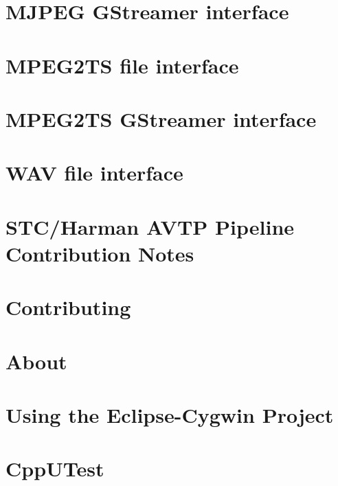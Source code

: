 \documentclass[twoside]{book}
\newcommand{\+}{\discretionary{\mbox{\scriptsize$\hookleftarrow$}}{}{}}
\begin{document}
\chapter{M\+J\+P\+EG G\+Streamer interface}
\label{mjpeg_gst_intf}
\hypertarget{mjpeg_gst_intf}{}

\chapter{M\+P\+E\+G2\+TS file interface}
\label{mpeg2ts_file_intf}
\hypertarget{mpeg2ts_file_intf}{}

\chapter{M\+P\+E\+G2\+TS G\+Streamer interface}
\label{mpeg2ts_gst_intf}
\hypertarget{mpeg2ts_gst_intf}{}

\chapter{W\+AV file interface}
\label{wav_file_intf}
\hypertarget{wav_file_intf}{}

\chapter{S\+T\+C/\+Harman A\+V\+TP Pipeline Contribution Notes}
\label{md_lib_avtp_pipeline_README}
\hypertarget{md_lib_avtp_pipeline_README}{}

\chapter{Contributing}
\label{md_lib_libavtp_HACKING}
\hypertarget{md_lib_libavtp_HACKING}{}

\chapter{About}
\label{md_lib_libavtp_README}
\hypertarget{md_lib_libavtp_README}{}

\chapter{Using the Eclipse-\/\+Cygwin Project}
\label{md_thirdparty_cpputest_platforms_Eclipse-Cygwin_README}
\hypertarget{md_thirdparty_cpputest_platforms_Eclipse-Cygwin_README}{}

\chapter{Cpp\+U\+Test}
\label{md_thirdparty_cpputest_README}
\hypertarget{md_thirdparty_cpputest_README}{}

\end{document}
